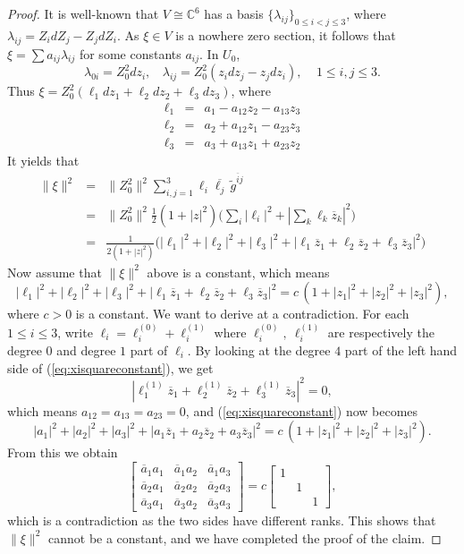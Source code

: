 \documentclass{amsart}
\numberwithin{equation}{section}
\theoremstyle{definition}
\renewcommand{\1}{\mathds{1}}
\renewcommand{\>}{\rightarrow}
\begin{document}
\begin{proof}
It is well-known that $V \cong {\mathbb C}^6 $ has a basis $\{ \lambda_{ij} \}_{0\leq i<j\leq 3}$, where
$ \lambda_{ij} = Z_i dZ_j - Z_j dZ_i$. As $\xi \in V$ is a nowhere zero section,
it follows that $\xi = \sum a_{ij}\lambda_{ij}$ for some constants $a_{ij}$. In $U_0$,
$$  \lambda_{0i}=Z_0^2dz_i, \ \ \ \ \lambda_{ij}=Z_0^2(z_idz_j-z_jdz_i), \ \ \ \ \ 1\leq i,j\leq 3. $$
Thus $ \xi = Z_0^2 (\ell_{1}dz_1 + \ell_2dz_2 + \ell_3dz_3)$, where
\begin{eqnarray*}
\ell_1 & = & a_1 - a_{12}z_2-a_{13}z_3 \\
\ell_2 & = & a_2 + a_{12}z_1-a_{23}z_3 \\
\ell_3 & = & a_3 + a_{13}z_1 + a_{23}z_2
\end{eqnarray*}
It yields that
\begin{eqnarray*}
\parallel\! \xi\! \parallel^2 & = & \parallel \!Z_0^2\! \parallel^2 \sum_{i,j=1}^3 \ell_i \overline{\ell_j} \, \tilde{g}^{\overline{i}j} \\
& = & \parallel \!Z_0^2\! \parallel^2  \frac{1}{2}(1+|z|^2) \big( \sum_i |\ell_i|^2 + |\sum_k \ell_k\overline{z}_k |^2 \big) \\
& = & \frac{1}{2(1+|z|^2)}  \big(  |\ell_1|^2 + |\ell_2|^2 + |\ell_3|^2 + |\ell_1 \overline{z}_1 + \ell_2 \overline{z}_2 + \ell_3 \overline{z}_3 |^2 \big)
\end{eqnarray*}
Now assume that $\|\xi\|^2$ above is a constant, which means
\begin{equation} \label{eq:xisquareconstant}
  |\ell_1|^2 + |\ell_2|^2 + |\ell_3|^2 + |\ell_1 \overline{z}_1 + \ell_2 \overline{z}_2 + \ell_3 \overline{z}_3 |^2 = c\,(1 + |z_1|^2 + |z_2|^2 + |z_3|^2),
  \end{equation}
where $c>0$ is a constant. We want to derive at a contradiction. For each $1\leq i\leq 3$, write $\ell_i=\ell_i^{(0)} + \ell_i^{(1)}$ where $\ell_i^{(0)},\ \ell_i^{(1)}$ are respectively  the degree $0$ and degree $1$ part of $\ell_i$. By looking at the degree $4$ part of the left hand side of (\ref{eq:xisquareconstant}), we get
\[ |\ell_1^{(1)} \overline{z}_1 + \ell_2^{(1)} \overline{z}_2 + \ell_3^{(1)} \overline{z}_3 |^2 =0,\]
which means $ a_{12}=a_{13}=a_{23}=0$, and (\ref{eq:xisquareconstant}) now becomes
\[ |a_{1}|^2 + |a_{2}|^2 + |a_{3}|^2 + |a_{1} \overline{z}_1 + a_{2} \overline{z}_2 + a_{3} \overline{z}_3 |^2 = c\,(1 + |z_1|^2 + |z_2|^2 + |z_3|^2). \]
From this we obtain
\[\begin{bmatrix} \overline{a}_1a_{1} & \overline{a}_1a_{2} & \overline{a}_1a_{3} \\
\overline{a}_2a_{1} & \overline{a}_2a_{2} & \overline{a}_2a_{3} \\
\overline{a}_3a_{1} & \overline{a}_{3}a_{2} & \overline{a}_{3}a_{3}\end{bmatrix}
= c\begin{bmatrix} 1 & & \\ & 1 & \\ & & 1\end{bmatrix}\!\!,\]
which is a contradiction as the two sides have different ranks. This shows that $\|\xi\|^2$ cannot be a constant, and we have completed the proof of the claim.
\end{proof}
\end{document}
